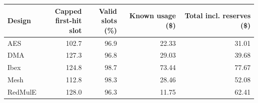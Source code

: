 \begin{tabular}{lrrrr}
\toprule
Design & \shortstack{Capped\\first-hit slot} & \shortstack{Valid\\slots (\%)} & \shortstack{Known\\usage (\$)} & \shortstack{Total incl.\\reserves (\$)} \\
\midrule
AES & 102.7 & 96.9 & 22.33 & 31.01 \\
DMA & 127.3 & 96.8 & 29.03 & 39.68 \\
Ibex & 124.8 & 98.7 & 73.44 & 77.67 \\
Mesh & 112.8 & 98.3 & 28.46 & 52.08 \\
RedMulE & 128.0 & 96.3 & 11.75 & 62.41 \\
\bottomrule
\end{tabular}
